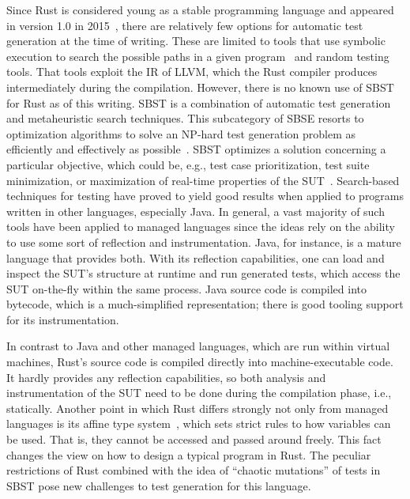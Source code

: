 \documentclass[paper=a4,%
  twoside,%
  BCOR4mm,%
  abstract=true,%
  toc=bibliography,%
  chapterprefix=true,%
  toc=bibliographynumbered,%
  open=right,%
  english,%
  pagesize=pdftex]{scrreprt}
\newcommand{\sut}{\ac{SUT}\xspace}
\begin{document}
Since Rust is considered young as a stable programming language and appeared in version 1.0 in 2015~\cite{Rust10}, there are relatively few options for automatic test generation at the time of writing. These are limited to tools that use symbolic execution to search the possible paths in a given program~\cite{cadar2008klee} and random testing tools. That tools exploit the \ac{IR} of LLVM, which the Rust compiler produces intermediately during the compilation. However, there is no known use of \ac{SBST} for Rust as of this writing. \ac{SBST} is a combination of automatic test generation and metaheuristic search techniques. This subcategory of \ac{SBSE} resorts to optimization algorithms to solve an NP-hard test generation problem as efficiently and effectively as possible~\cite{Khari2019}. \ac{SBST} optimizes a solution concerning a particular objective, which could be, e.g., test case prioritization, test suite minimization, or maximization of real-time properties of the \sut~\cite{Khari2019}. Search-based techniques for testing have proved to yield good results when applied to programs written in other languages, especially Java. In general, a vast majority of such tools have been applied to managed languages since the ideas rely on the ability to use some sort of reflection and instrumentation. Java, for instance, is a mature language that provides both. With its reflection capabilities, one can load and inspect the \sut's structure at runtime and run generated tests, which access the \sut on-the-fly within the same process. Java source code is compiled into bytecode, which is a much-simplified representation; there is good tooling support for its instrumentation.

In contrast to Java and other managed languages, which are run within virtual machines, Rust's source code is compiled directly into machine-executable code. It hardly provides any reflection capabilities, so both analysis and instrumentation of the \sut need to be done during the compilation phase, i.e., statically. Another point in which Rust differs strongly not only from managed languages is its affine type system~\cite{Anderson2016}, which sets strict rules to how variables can be used. That is, they cannot be accessed and passed around freely. This fact changes the view on how to design a typical program in Rust. The peculiar restrictions of Rust combined with the idea of ``chaotic mutations'' of tests in \ac{SBST} pose new challenges to test generation for this language.
\end{document}
